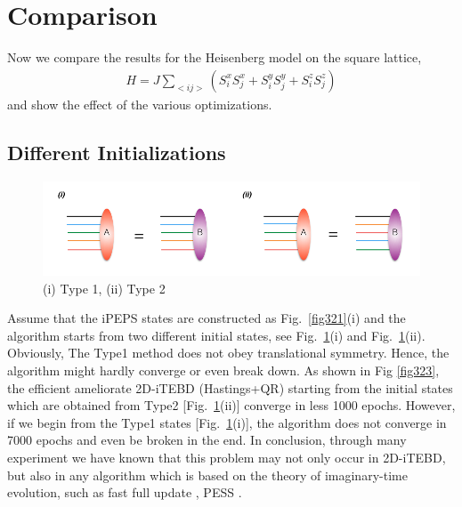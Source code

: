 \section{Comparison} 
\label{Comparison}

Now we compare the results for the Heisenberg model on the square lattice,
\begin{align}
	\label{mapgroud}
	H = J \sum_{<ij>}{\left( S^{x}_{i}S^{x}_{j}+S^{y}_{i}S^{y}_{j}+S^{z}_{i}S^{z}_{j} \right)}
\end{align}
and show the effect of the various optimizations.

\subsection{Different Initializations}

\begin{figure}[ht]
	\centering
	\includegraphics[width=1.00\textwidth]{figures/fig322.png}
	\caption[Different methods to initialize the states]{(i) Type 1, (ii) Type 2}
	\label{fig322}
\end{figure}

Assume that the iPEPS states are constructed as Fig.~\ref{fig321}(i) and the algorithm starts from two different initial states, see Fig.~\ref{fig322}(i) and Fig.~\ref{fig322}(ii). Obviously, The Type1 method does not obey translational symmetry. Hence, the algorithm might hardly converge or even break down. As shown in Fig \ref{fig323}, the efficient ameliorate 2D-iTEBD (Hastings+QR) starting from the initial states which are obtained from Type2 [Fig.~\ref{fig322}(ii)] converge in less 1000 epochs. However, if we begin from the Type1 states [Fig.~\ref{fig322}(i)], the algorithm does not converge in 7000 epochs and even be broken in the end. 
In conclusion, through many experiment we have known that this problem may not only occur in 2D-iTEBD, but also in any algorithm which is based on the theory of imaginary-time evolution, such as fast full update \cite{PhysRevB.92.035142}, PESS \cite{PhysRevX.4.011025}.

